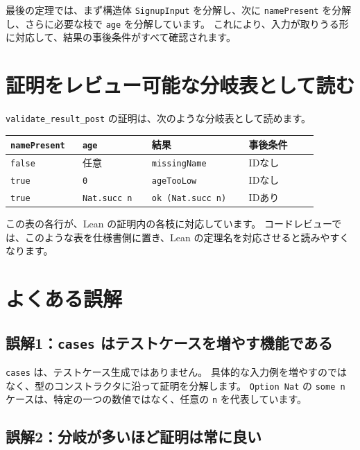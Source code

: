 最後の定理では、まず構造体 \texttt{SignupInput} を分解し、次に \texttt{namePresent} を分解し、さらに必要な枝で \texttt{age} を分解しています。
これにより、入力が取りうる形に対応して、結果の事後条件がすべて確認されます。

\section{証明をレビュー可能な分岐表として読む}

\texttt{validate\_result\_post} の証明は、次のような分岐表として読めます。

\begin{center}
\begin{tabular}{p{0.20\linewidth}p{0.20\linewidth}p{0.28\linewidth}p{0.20\linewidth}}
\toprule
\texttt{namePresent} & \texttt{age} & 結果 & 事後条件 \\
\midrule
\texttt{false} & 任意 & \texttt{missingName} & IDなし \\
\texttt{true} & \texttt{0} & \texttt{ageTooLow} & IDなし \\
\texttt{true} & \texttt{Nat.succ n} & \texttt{ok (Nat.succ n)} & IDあり \\
\bottomrule
\end{tabular}
\end{center}

この表の各行が、Lean の証明内の各枝に対応しています。
コードレビューでは、このような表を仕様書側に置き、Lean の定理名を対応させると読みやすくなります。

\section{よくある誤解}

\subsection{誤解1：\texttt{cases} はテストケースを増やす機能である}

\texttt{cases} は、テストケース生成ではありません。
具体的な入力例を増やすのではなく、型のコンストラクタに沿って証明を分解します。
\texttt{Option Nat} の \texttt{some n} ケースは、特定の一つの数値ではなく、任意の \texttt{n} を代表しています。

\subsection{誤解2：分岐が多いほど証明は常に良い}

